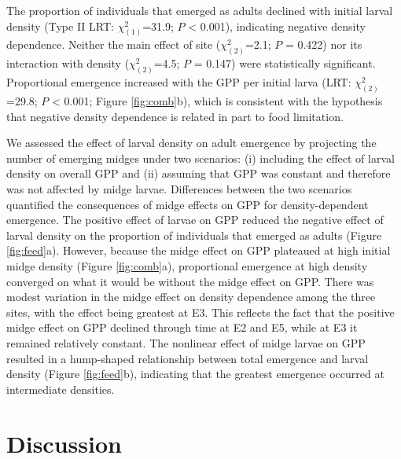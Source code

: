 \documentclass[12pt]{article}
\begin{document}
The proportion of individuals that emerged as adults declined with initial larval density 
(Type II LRT: $\chi^2_{(1)}$=31.9; $\textit{P}$ < 0.001), 
indicating negative density dependence.
Neither the main effect of site
($\chi^2_{(2)}$=2.1; $\textit{P}$ = 0.422)
nor its interaction with density 
($\chi^2_{(2)}$=4.5; $\textit{P}$ = 0.147) were statistically significant.
Proportional emergence increased with the GPP per initial larva 
(LRT: $\chi^2_{(2)}$=29.8; $\textit{P}$ < 0.001; Figure \ref{fig:comb}b),
which is consistent with the hypothesis that negative density dependence is 
related in part to food limitation.

We assessed the effect of larval density on adult emergence 
by projecting the number of emerging midges under two scenarios: 
(i) including the effect of larval density on overall GPP
and (ii) assuming that GPP was constant and therefore was not affected by midge larvae.  
Differences between the two scenarios quantified the consequences of midge effects on GPP
for density-dependent emergence.
The positive effect of larvae on GPP
reduced the negative effect of larval density
on the proportion of individuals that emerged as adults
(Figure \ref{fig:feed}a).
However, because the midge effect on GPP plateaued at high initial midge density 
(Figure \ref{fig:comb}a),
proportional emergence at high density converged on what it would be 
without the midge effect on GPP.
There was modest variation in the midge effect 
on density dependence among the three sites, with the effect being greatest at E3. 
This reflects the fact that the positive midge effect 
on GPP declined through time at E2 and E5, 
while at E3 it remained relatively constant. 
The nonlinear effect of midge larvae on GPP resulted in a hump-shaped relationship
between total emergence and larval density (Figure \ref{fig:feed}b),
indicating that the greatest emergence occurred at intermediate densities.







\section*{Discussion}
\end{document}
